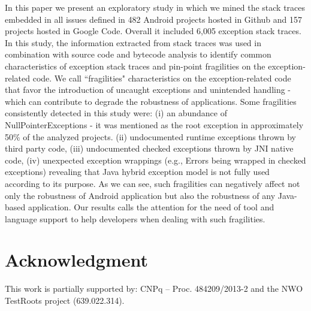 \documentclass[conference]{IEEEtran}
\begin{document}
In this paper we present an exploratory study in which we mined the stack 
traces embedded in all issues defined in 482 Android projects hosted in Github and 
157 projects hosted in Google Code. Overall it included 6,005 exception stack traces.
In this study, the information extracted from stack traces was used in combination 
with source code and bytecode analysis to identify common characteristics of exception 
stack traces and pin-point fragilities on the exception-related code. 
We call ``fragilities" characteristics on the exception-related code that favor the introduction
of  uncaught exceptions and unintended handling - which can contribute to 
degrade the robustness of applications.
Some fragilities consistently detected in this study were: 
(i) an abundance of NullPointerExceptions - it was mentioned as the root exception in approximately 
50\% of the analyzed projects. 
(ii) undocumented runtime exceptions thrown by third party code,
(iii) undocumented checked exceptions thrown by JNI native code,
(iv) unexpected exception wrappings (e.g., Errors being wrapped in checked exceptions) 
revealing that Java hybrid exception model is not fully used according to its purpose.
As we can see, such fragilities can negatively affect not only the robustness of Android application 
but also the robustness of any Java-based application. 
Our results calls the attention for the need of tool and language support to help 
developers when dealing with such fragilities.

 



\section*{Acknowledgment} This work is partially supported by: CNPq -- Proc.
484209/2013-2 and the NWO TestRoots project (639.022.314).





\end{document}
